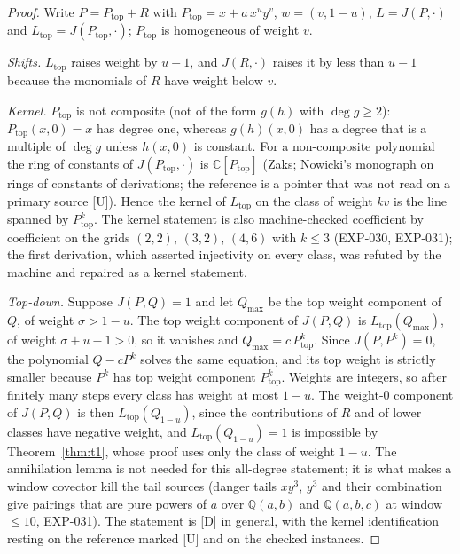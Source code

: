 \documentclass[11pt]{article}
\theoremstyle{remark}
\newcommand{\C}{\mathbb{C}}
\newcommand{\Q}{\mathbb{Q}}
\begin{document}
\begin{proof}
Write $P=P_{\mathrm{top}}+R$ with $P_{\mathrm{top}}=x+a\,x^uy^v$, $w=(v,1-u)$, $L=J(P,\cdot)$ and $L_{\mathrm{top}}=J(P_{\mathrm{top}},\cdot)$;
$P_{\mathrm{top}}$ is homogeneous of weight $v$.

\emph{Shifts.} $L_{\mathrm{top}}$ raises weight by $u-1$, and $J(R,\cdot)$ raises it by less than $u-1$ because the monomials of $R$ have weight below $v$.

\emph{Kernel.} $P_{\mathrm{top}}$ is not composite (not of the form $g(h)$ with $\deg g\ge2$): $P_{\mathrm{top}}(x,0)=x$ has degree one, whereas $g(h)(x,0)$ has a
degree that is a multiple of $\deg g$ unless $h(x,0)$ is constant. For a non-composite polynomial the ring of constants of $J(P_{\mathrm{top}},\cdot)$ is
$\C[P_{\mathrm{top}}]$ (Zaks; Nowicki's monograph on rings of constants of derivations; the reference is a pointer that was not read on a primary source [U]).
Hence the kernel of $L_{\mathrm{top}}$ on the class of weight $kv$ is the line spanned by $P_{\mathrm{top}}^k$. The kernel statement is also
machine-checked coefficient by coefficient on the grids $(2,2)$, $(3,2)$, $(4,6)$ with $k\le3$ (EXP-030, EXP-031); the first derivation, which asserted
injectivity on every class, was refuted by the machine and repaired as a kernel statement.

\emph{Top-down.} Suppose $J(P,Q)=1$ and let $Q_{\max}$ be the top weight component of $Q$, of weight $\sigma>1-u$. The top weight component of
$J(P,Q)$ is $L_{\mathrm{top}}(Q_{\max})$, of weight $\sigma+u-1>0$, so it vanishes and $Q_{\max}=c\,P_{\mathrm{top}}^k$. Since $J(P,P^k)=0$, the polynomial
$Q-cP^k$ solves the same equation, and its top weight is strictly smaller because $P^k$ has top weight component $P_{\mathrm{top}}^k$. Weights are
integers, so after finitely many steps every class has weight at most $1-u$. The weight-$0$ component of $J(P,Q)$ is then $L_{\mathrm{top}}(Q_{1-u})$, since
the contributions of $R$ and of lower classes have negative weight, and $L_{\mathrm{top}}(Q_{1-u})=1$ is impossible by Theorem~\ref{thm:t1}, whose proof
uses only the class of weight $1-u$. The annihilation lemma is not needed for this all-degree statement; it is what makes a window covector kill the tail sources
(danger tails $xy^3$, $y^3$ and their combination give pairings that are pure powers of $a$ over $\Q(a,b)$ and $\Q(a,b,c)$ at window $\le10$, EXP-031). The statement is
[D] in general, with the kernel identification resting on the reference marked [U] and on the checked instances.
\end{proof}
\end{document}

